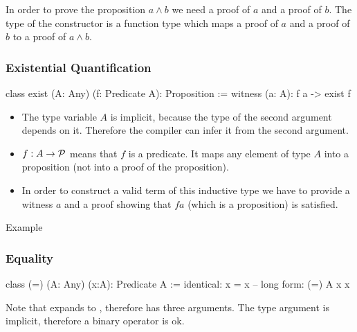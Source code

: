 In order to prove the proposition $a \land b$ we need a proof of $a$ and a
proof of $b$. The type of the constructor is a function type which maps a
proof of $a$ and a proof of $b$ to a proof of $a \land b$.
\newline





\subsubsection{Existential Quantification}

\begin{alba}
  class
    exist (A: Any) (f: Predicate A): Proposition
  :=
    witness (a: A): f a -> exist f
\end{alba}

\begin{itemize}
\item The type variable $A$ is implicit, because the type of the second
  argument depends on it. Therefore the compiler can infer it from the second
  argument.

\item $f:A\to {\cal{P}}$ means that $f$ is a predicate. It maps any element of
  type $A$ into a proposition (not into a proof of the proposition).

\item In order to construct a valid term of this inductive type we have to
  provide a witness $a$ and a proof showing that $f a$ (which is a
  proposition) is satisfied.
\end{itemize}

Example
\vskip 2mm


\subsubsection{Equality}
\label{sec:equality}

\begin{alba}
  class
    (=) (A: Any) (x:A): Predicate A
  :=
    identical: x = x    -- long form: (=) A x x
\end{alba}

Note that  expands to , therefore
\code{(=)} has three arguments. The type argument is implicit, therefore a
binary operator is ok.
\vskip 2mm








